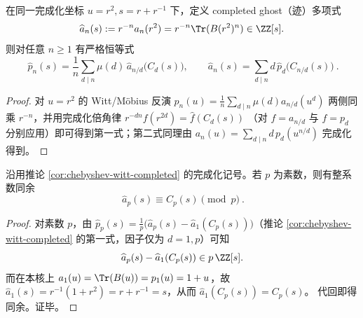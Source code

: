 \begin{corollary}\label{cor:chebyshev-witt-completed}
在同一完成化坐标 \(u=r^2,s=r+r^{-1}\) 下，定义 completed ghost（迹）多项式
\[
\widehat a_n(s):=r^{-n}a_n(r^2)=r^{-n}\Tr(B(r^2)^n)\in\ZZ[s].
\]
则对任意 \(n\ge 1\) 有严格恒等式
\[
\boxed{\ 
\widehat p_n(s)=\frac1n\sum_{d\mid n}\mu(d)\,\widehat a_{n/d}\!\bigl(C_d(s)\bigr),
\qquad
\widehat a_n(s)=\sum_{d\mid n}d\,\widehat p_d\!\bigl(C_{n/d}(s)\bigr)
\ }.
\]
\end{corollary}
\begin{proof}
对 \(u=r^2\) 的 Witt/Möbius 反演
\(
p_n(u)=\frac1n\sum_{d\mid n}\mu(d)a_{n/d}(u^d)
\)
两侧同乘 \(r^{-n}\)，并用完成化倍角律
\(
r^{-dn}f(r^{2d})=\widehat f(C_d(s))
\)
（对 \(f=a_{n/d}\) 与 \(f=p_d\) 分别应用）即可得到第一式；第二式同理由
\(
a_n(u)=\sum_{d\mid n} d\,p_d(u^{n/d})
\)
完成化得到。
\end{proof}

\begin{corollary}\label{cor:completed-prime-congruence}
沿用推论 \ref{cor:chebyshev-witt-completed} 的完成化记号。若 \(p\) 为素数，则有整系数同余
\[
\boxed{\ \widehat a_p(s)\equiv C_p(s)\pmod p\ }.
\]
\end{corollary}
\begin{proof}
对素数 \(p\)，由 \(\widehat p_p(s)=\frac1p\bigl(\widehat a_p(s)-\widehat a_1(C_p(s))\bigr)\)（推论 \ref{cor:chebyshev-witt-completed} 的第一式，因子仅为 \(d=1,p\)）可知
\[
\widehat a_p(s)-\widehat a_1(C_p(s))\in p\,\ZZ[s].
\]
而在本核上 \(a_1(u)=\Tr(B(u))=p_1(u)=1+u\)，故
\(
\widehat a_1(s)=r^{-1}(1+r^2)=r+r^{-1}=s
\)，从而 \(\widehat a_1(C_p(s))=C_p(s)\)。
代回即得同余。证毕。
\end{proof}


